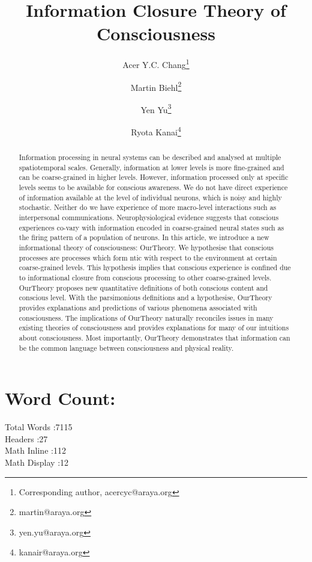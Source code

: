 \documentclass[utf8]{article}
\title{Information Closure Theory of Consciousness}
\date{}
\author[]{Acer Y.C. Chang\thanks{Corresponding author, acercyc@araya.org}}
\author[]{Martin Biehl\thanks{martin@araya.org}}
\author[]{Yen Yu\thanks{yen.yu@araya.org}}
\author[]{Ryota Kanai\thanks{kanair@araya.org }}
\affil[]{ARAYA, Inc., Tokyo, Japan}
\begin{document}
    \linenumbers
	\maketitle
	
	\section*{Word Count:}
	Total Words :7115\\
    Headers :27\\
    Math Inline :112\\
    Math Display :12\\
    
    
	\tableofcontents


	\begin{abstract}
		Information processing in neural systems can be described and analysed at multiple spatiotemporal scales. Generally, information at lower levels is more fine-grained and can be coarse-grained in higher levels. However, information processed only at specific levels seems to be available for conscious awareness. We do not have direct experience of information available at the level of individual neurons, which is noisy and highly stochastic. Neither do we have experience of more macro-level interactions such as interpersonal communications. Neurophysiological evidence suggests that conscious experiences co-vary with information encoded in coarse-grained neural states such as the firing pattern of a population of neurons. In this article, we introduce a new informational theory of consciousness: \acf{OurTheory}. We hypothesise that conscious processes are processes which form \ac{ntic} with respect to the environment at certain coarse-grained levels. This hypothesis implies that conscious experience is confined due to informational closure from conscious processing to other coarse-grained levels. \ac{OurTheory} proposes new quantitative definitions of both conscious content and conscious level. With the parsimonious definitions and a hypothesise, \ac{OurTheory} provides explanations and predictions of various phenomena associated with consciousness. The implications of \ac{OurTheory} naturally reconciles issues in many existing theories of consciousness and provides explanations for many of our intuitions about consciousness. Most importantly, \ac{OurTheory} demonstrates that information can be the common language between consciousness and physical reality.

		
	\end{abstract}
\end{document}
